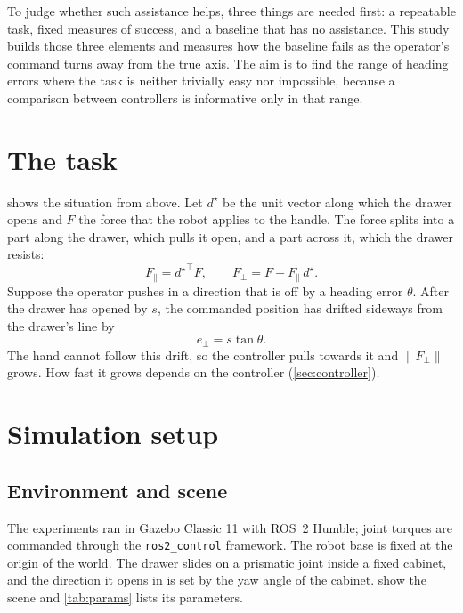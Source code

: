 \documentclass[11pt,a4paper]{article}
\newcommand{\norm}[1]{\left\lVert #1 \right\rVert}
\newcommand{\Fperp}{F_{\perp}}
\newcommand{\Fpar}{F_{\parallel}}
\newcommand{\dstar}{d^{\star}}
\begin{document}
To judge whether such assistance helps, three things are needed first: a repeatable task, fixed
measures of success, and a baseline that has no assistance. This study builds those three
elements and measures how the baseline fails as the operator's command turns away from the
true axis. The aim is to find the range of heading errors where the task is neither trivially
easy nor impossible, because a comparison between controllers is informative only in that range.

\section{The task}\label{sec:problem}

 shows the situation from above. Let $\dstar$ be the unit vector along which the
drawer opens and $F$ the force that the robot applies to the handle. The force splits into a
part along the drawer, which pulls it open, and a part across it, which the drawer resists:
\begin{equation}\label{eq:split}
  \Fpar = {\dstar}^{\top} F, \qquad
  \Fperp = F - \Fpar\, \dstar .
\end{equation}
Suppose the operator pushes in a direction that is off by a heading error $\theta$. After the
drawer has opened by $s$, the commanded position has drifted sideways from the drawer's line by
\begin{equation}\label{eq:drift}
  e_\perp = s \tan\theta .
\end{equation}
The hand cannot follow this drift, so the controller pulls towards it and $\norm{\Fperp}$ grows.
How fast it grows depends on the controller (\cref{sec:controller}).

\section{Simulation setup}\label{sec:setup}

\subsection{Environment and scene}

The experiments ran in Gazebo Classic 11 with ROS~2 Humble; joint torques are commanded through
the \texttt{ros2\_control} framework. The robot base is fixed at the origin of the world. The
drawer slides on a prismatic joint inside a fixed cabinet, and the direction it opens in is set by
the yaw angle of the cabinet.  show the scene and \cref{tab:params} lists
its parameters.
\end{document}
